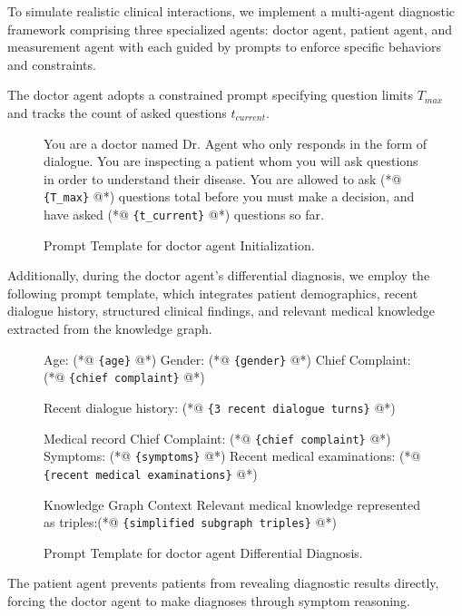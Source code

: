 \documentclass[11pt]{article}
\newcommand{\Doctor}{doctor agent\xspace}
\newcommand{\Patient}{patient agent\xspace}
\newcommand{\Measurement}{measurement agent\xspace}
\newcommand{\placeholder}[1]{%
	\colorbox{blue!10}{\texttt{\color{blue!80!black}\{#1\}}}%
}
\begin{document}
To simulate realistic clinical interactions, we implement a multi-agent diagnostic framework comprising three specialized agents: \Doctor, \Patient, and \Measurement with each guided by prompts to enforce specific behaviors and constraints. 

The \Doctor adopts a constrained prompt specifying question limits $T_{max}$ and tracks the count of asked questions $t_{current}$. 

\begin{figure}[H]
	\caption{Prompt Template for \Doctor Initialization.}
	\begin{promptlisting}
		You are a doctor named Dr. Agent who only responds in the form of dialogue. You are inspecting a patient whom you will ask questions in order to understand their disease.
		You are allowed to ask (*@\placeholder{T\_max}@*) questions total before you must make a decision, and have asked (*@\placeholder{t\_current}@*) questions so far. 
	\end{promptlisting}
	\label{prompt5}
\end{figure}

Additionally, during the \Doctor’s differential diagnosis, we employ the following prompt template, which integrates patient demographics, recent dialogue history, structured clinical findings, and relevant medical knowledge extracted from the knowledge graph.

\begin{figure}[H]
	\caption{Prompt Template for \Doctor Differential Diagnosis.}
	\begin{promptlisting}
		Age: (*@\placeholder{age}@*)
		Gender: (*@\placeholder{gender}@*)
		Chief Complaint: (*@\placeholder{chief complaint}@*)
		
		Recent dialogue history: (*@\placeholder{3 recent dialogue turns}@*)
		
		Medical record
		Chief Complaint: (*@\placeholder{chief complaint}@*)
		Symptoms: (*@\placeholder{symptoms}@*)
		Recent medical examinations: (*@\placeholder{recent medical examinations}@*)
		
		Knowledge Graph Context
		Relevant medical knowledge represented as triples:(*@\placeholder{simplified subgraph triples}@*)
		
	\end{promptlisting}
	\label{prompt6}
\end{figure}

The \Patient prevents patients from revealing diagnostic results directly, forcing the \Doctor to make diagnoses through symptom reasoning.
\end{document}
